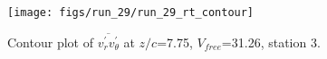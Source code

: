 \begin{figure}[H]
\centering
\texttt{[image: figs/run\_29/run\_29\_rt\_contour]}
\caption{Contour plot of $\overline{v_{r}^{\prime} v_{\theta}^{\prime}}$ at $z/c$=7.75, $V_{free}$=31.26, station 3.}
\label{fig:run_29_rt_contour}
\end{figure}


